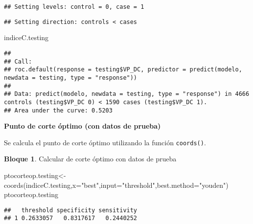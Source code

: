 \documentclass[
]{book}
\newenvironment{Shaded}{\begin{snugshade}}{\end{snugshade}}
\newcommand{\AttributeTok}[1]{\textcolor[rgb]{0.77,0.63,0.00}{#1}}
\newcommand{\FunctionTok}[1]{\textcolor[rgb]{0.00,0.00,0.00}{#1}}
\newcommand{\NormalTok}[1]{#1}
\newcommand{\OtherTok}[1]{\textcolor[rgb]{0.56,0.35,0.01}{#1}}
\newcommand{\SpecialCharTok}[1]{\textcolor[rgb]{0.00,0.00,0.00}{#1}}
\newcommand{\StringTok}[1]{\textcolor[rgb]{0.31,0.60,0.02}{#1}}
\theoremstyle{definition}
\theoremstyle{definition}
\newtheorem{example}{Bloque}[chapter]
\theoremstyle{definition}
\theoremstyle{definition}
\theoremstyle{remark}
\begin{document}
\begin{verbatim}
## Setting levels: control = 0, case = 1
\end{verbatim}

\begin{verbatim}
## Setting direction: controls < cases
\end{verbatim}

\begin{Shaded}
\begin{Highlighting}[]
\NormalTok{indiceC.testing}
\end{Highlighting}
\end{Shaded}

\begin{verbatim}
## 
## Call:
## roc.default(response = testing$VP_DC, predictor = predict(modelo,     newdata = testing, type = "response"))
## 
## Data: predict(modelo, newdata = testing, type = "response") in 4666 controls (testing$VP_DC 0) < 1590 cases (testing$VP_DC 1).
## Area under the curve: 0.5203
\end{verbatim}

\textbf{Punto de corte óptimo (con datos de prueba)}

Se calcula el punto de corte óptimo utilizando la función \texttt{coords()}.

\begin{example}
\protect\hypertarget{exm:bloque22nbm}{}\label{exm:bloque22nbm}Calcular de corte óptimo con datos de prueba
\end{example}

\begin{Shaded}
\begin{Highlighting}[]
\NormalTok{ptocorteop.testing}\OtherTok{\textless{}{-}}\FunctionTok{coords}\NormalTok{(indiceC.testing,}\AttributeTok{x=}\StringTok{"best"}\NormalTok{,}\AttributeTok{input=}\StringTok{"threshold"}\NormalTok{,}\AttributeTok{best.method=}\StringTok{"youden"}\NormalTok{)}
\NormalTok{ptocorteop.testing}
\end{Highlighting}
\end{Shaded}

\begin{verbatim}
##   threshold specificity sensitivity
## 1 0.2633057   0.8317617   0.2440252
\end{verbatim}

\begin{Shaded}
\end{Shaded}
\end{document}
